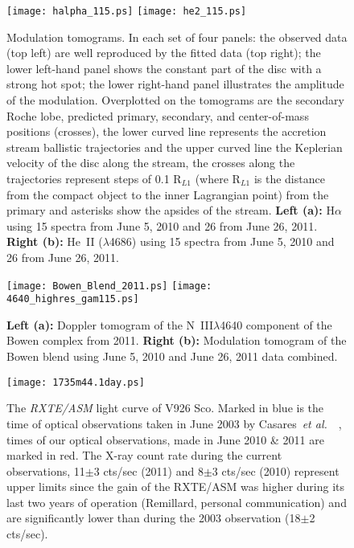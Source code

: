 \documentclass{aa}
\def\etal{{\em et al.}\ }
\begin{document}
\begin{figure*}
\texttt{[image: halpha\_115.ps]}
 \texttt{[image: he2\_115.ps]}
 \hspace{0.7cm}
 \caption{Modulation tomograms.   In
 each
set of four panels: the observed data (top left) are well reproduced by the fitted
data (top right); the lower left-hand panel shows the constant part of the
disc with a strong hot spot; the lower right-hand panel illustrates the
amplitude of the modulation. 
Overplotted on the tomograms are the secondary Roche lobe, predicted
primary, secondary, and center-of-mass positions (crosses), the lower curved
line
represents the accretion stream ballistic trajectories
and the upper curved line the Keplerian velocity of the disc
along the stream, the crosses along the trajectories represent
steps of 0.1 R$_{L1}$ (where R$_{L1}$ is the distance from the compact
object to the inner Lagrangian point)
from the primary and asterisks show the apsides of
the stream.
{\bf Left (a):} H$\alpha$ using 15 spectra from June 5, 2010 and
26 from June 26, 2011. {\bf Right (b):}
He~II ($\lambda$4686) using 15 spectra from June 5, 2010 and
26 from June 26, 2011.}
\label{mod1}
\end{figure*}


\begin{figure*}
\texttt{[image: Bowen\_Blend\_2011.ps]}
\texttt{[image: 4640\_highres\_gam115.ps]}
\caption{{\bf Left (a):} Doppler tomogram of the N~III$\lambda$4640
component of the Bowen complex from 2011. 
{\bf Right (b):} Modulation tomogram of the Bowen blend using
June 5, 2010 and June 26, 2011 data combined.
}
\label{bowdop}
\end{figure*}

\begin{figure}
\texttt{[image: 1735m44.1day.ps]}
 \caption{
The {\it RXTE/ASM} light curve of V926 Sco.  Marked in blue is the time of optical observations taken in June 2003 by
Casares~\etal~\cite{casares}, times of our optical observations, made in June 2010 \& 2011 are marked in red.
The X-ray count rate during the current
observations, 11$\pm$3 cts/sec (2011) and 8$\pm$3 cts/sec (2010) represent upper limits since the gain of the RXTE/ASM was higher
during its last two years of operation (Remillard, personal communication) and are
significantly lower than during the 2003 observation
(18$\pm$2 cts/sec).}
\hspace{0.3cm}
\label{rxte}
\end{figure}
\end{document}
